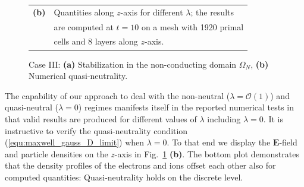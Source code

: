 \documentclass{article}
\begin{document}
\begin{figure}
\begin{minipage}[t]{0.6\textwidth}
   \parbox{0.9\textwidth}{\begin{tabular}[c]{ll}
     \textbf{(b)} & Quantities along $z$-axis for different $\lambda$; the results \\ & 
     are computed at $t = 10$ on a mesh with 1920 primal  \\ &  cells and 8 layers along $z$-axis.
   \end{tabular}}
\end{minipage}%

\caption{Case III: \textbf{(a)} Stabilization in the non-conducting domain $\Omega_N$,
  \textbf{(b)} Numerical quasi-neutrality.    }
\label{fig:stabilization_comparison}
\end{figure}

The capability of our approach to deal with the non-neutral ($\lambda = \mathcal{O}(1)$)
and quasi-neutral ($\lambda = 0$) regimes manifests itself in the reported numerical tests
in that valid results are produced for different values of $\lambda$ including
$\lambda=0$. It is instructive to verify the quasi-neutrality condition
(\ref{equ:maxwell_gauss_D_limit}) when $\lambda = 0$. To that end we display the
$\mathbf{E}$-field and particle densities on the $z$-axis in
Fig.~\ref{fig:stabilization_comparison} \textbf{(b)}. The bottom plot demonstrates that
the density profiles of the electrons and ions offset each other also for computed quantities:
Quasi-neutrality holds on the discrete level.
\end{document}
